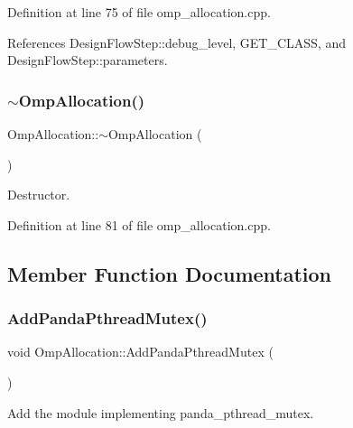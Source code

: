 Definition at line 75 of file omp\+\_\+allocation.\+cpp.



References Design\+Flow\+Step\+::debug\+\_\+level, G\+E\+T\+\_\+\+C\+L\+A\+SS, and Design\+Flow\+Step\+::parameters.

\mbox{\label{classOmpAllocation_afded4e8460c5854247bd8cd053a4e3bd}} 
\subsubsection{\texorpdfstring{$\sim$\+Omp\+Allocation()}{~OmpAllocation()}}
{\footnotesize\ttfamily Omp\+Allocation\+::$\sim$\+Omp\+Allocation (\begin{DoxyParamCaption}{ }\end{DoxyParamCaption})}



Destructor. 



Definition at line 81 of file omp\+\_\+allocation.\+cpp.



\subsection{Member Function Documentation}
\mbox{\label{classOmpAllocation_a5a8ea4456a4be776f88dee04f0a5cc6e}} 
\subsubsection{\texorpdfstring{Add\+Panda\+Pthread\+Mutex()}{AddPandaPthreadMutex()}}
{\footnotesize\ttfamily void Omp\+Allocation\+::\+Add\+Panda\+Pthread\+Mutex (\begin{DoxyParamCaption}{ }\end{DoxyParamCaption})\hspace{0.3cm}{\ttfamily [protected]}}



Add the module implementing panda\+\_\+pthread\+\_\+mutex. 

